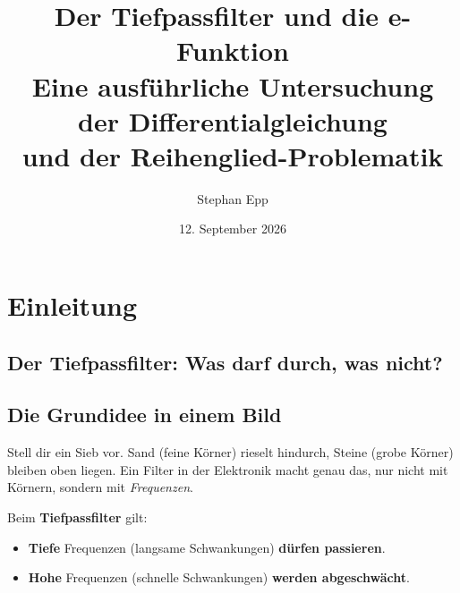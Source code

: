 \documentclass[a4paper,12pt,twoside]{report}
\title{\textbf{Der Tiefpassfilter und die e-Funktion} \\ 
{\Large Eine ausführliche Untersuchung der Differentialgleichung \\ und der Reihenglied-Problematik}}
\author{Stephan Epp}
\date{12. September 2026}
\theoremstyle{definition}
\begin{document}
	
\maketitle

\tableofcontents

\newpage

\newcommand{\signalbild}[3]{%
  \begin{tikzpicture}[xscale=8, yscale=1]
    \draw[->] (0,0) -- (1.06,0) node[right] {$t$};
    \draw[->] (0,-1.25) -- (0,1.35) node[above] {$U$};
    \draw[gray, thick, domain=0:1, samples=300]
      plot (\x, {sin(360*#1*\x)});
    \draw[red!70!black, very thick, domain=0:1, samples=300]
      plot (\x, {#2*sin(360*#1*\x-#3)});
    \draw[dashed, gray] (0,1) -- (1,1);
    \draw[dashed, gray] (0,-1) -- (1,-1);
    \node[left] at (0,1) {\small $1$};
    \node[left] at (0,-1) {\small $-1$};
  \end{tikzpicture}%
}

\section*{Einleitung}

\subsection*{Der Tiefpassfilter: Was darf durch, was nicht?}

\subsection*{Die Grundidee in einem Bild}

Stell dir ein Sieb vor. Sand (feine Körner) rieselt hindurch, Steine
(grobe Körner) bleiben oben liegen. Ein Filter in der Elektronik macht
genau das, nur nicht mit Körnern, sondern mit \emph{Frequenzen}.

Beim \textbf{Tiefpassfilter} gilt:
\begin{itemize}
  \item \textbf{Tiefe} Frequenzen (langsame Schwankungen) \textbf{dürfen passieren}.
  \item \textbf{Hohe} Frequenzen (schnelle Schwankungen) \textbf{werden abgeschwächt}.
\end{itemize}
\end{document}
